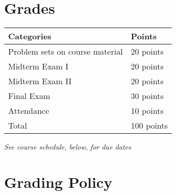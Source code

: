\documentclass[12pt]{article}
\begin{document}
\newpage

\section*{Grades}

\newlength\q
\setlength{}
\begin{tabular}{|p{\q}|p{\q}|}
    \hline
    Categories  & Points \\
    \hline
    \hline
    Problem sets on course material   & 20 points \\
    \hline
    Midterm Exam
I & 20 points \\
    \hline
    Midterm Exam II & 20 points \\
    \hline
    Final Exam & 30 points \\
    \hline
    Attendance & 10 points \\
    \hline
    Total & 100 points \\
    \hline
\end{tabular}
\textit{See course schedule, below, for due dates} \\


\section*{Grading Policy}


\end{document}
